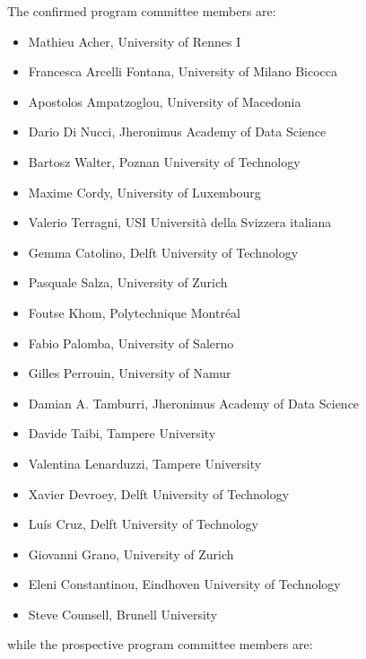 \medskip
\noindent The confirmed program committee members are:
\begin{itemize}[topsep=0.5em, itemsep=0.5em]
	\item Mathieu Acher, University of Rennes I
	\item Francesca Arcelli Fontana, University of  Milano Bicocca
	\item Apostolos Ampatzoglou, University of Macedonia
	\item Dario Di Nucci, Jheronimus Academy of Data Science
	\item Bartosz Walter, Poznan University of Technology
	\item Maxime Cordy, University of Luxembourg
	\item Valerio Terragni, USI Università della Svizzera italiana
	\item Gemma Catolino, Delft University of Technology
	\item Pasquale Salza, University of Zurich
	\item Foutse Khom, Polytechnique Montréal
	\item Fabio Palomba, University of Salerno
	\item Gilles Perrouin, University of Namur
	\item Damian A. Tamburri, Jheronimus Academy of Data Science
	\item Davide Taibi, Tampere University
	\item Valentina Lenarduzzi, Tampere University
	\item Xavier Devroey, Delft University of Technology
	\item Luís Cruz, Delft University of Technology
	\item Giovanni Grano, University of Zurich
	\item Eleni Constantinou, Eindhoven University of Technology
	\item Steve Counsell, Brunell University
\end{itemize}

\smallskip
\noindent while the prospective program committee members are:

